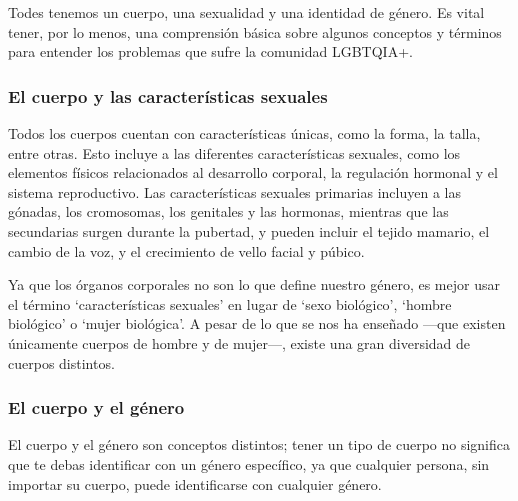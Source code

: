 \documentclass[12pt,openany]{book}
\begin{document}
Todes tenemos un cuerpo, una sexualidad y una identidad de género. Es vital tener, por lo menos, una comprensión básica sobre algunos conceptos y términos para entender los problemas que sufre la comunidad LGBTQIA+.

\subsubsection*{El cuerpo y las características sexuales}

Todos los cuerpos cuentan con características únicas, como la forma, la talla, entre otras. Esto incluye a las diferentes características sexuales, como los elementos físicos relacionados al desarrollo corporal, la regulación hormonal y el sistema reproductivo. Las características sexuales primarias incluyen a las gónadas, los cromosomas, los genitales y las hormonas, mientras que las secundarias surgen durante la pubertad, y pueden incluir el tejido mamario, el cambio de la voz, y el crecimiento de vello facial y púbico.

Ya que los órganos corporales no son lo que define nuestro género, es mejor usar el término `características sexuales' en lugar de `sexo biológico', `hombre biológico' o `mujer biológica'. A pesar de lo que se nos ha enseñado —que existen únicamente cuerpos de hombre y de mujer—, existe una gran diversidad de cuerpos distintos.

\begin{figure}[h]
    \centering
\end{figure}

\subsubsection*{El cuerpo y el género}

El cuerpo y el género son conceptos distintos; tener un tipo de cuerpo no significa que te debas identificar con un género específico, ya que cualquier persona, sin importar su cuerpo, puede identificarse con cualquier género.
\end{document}
